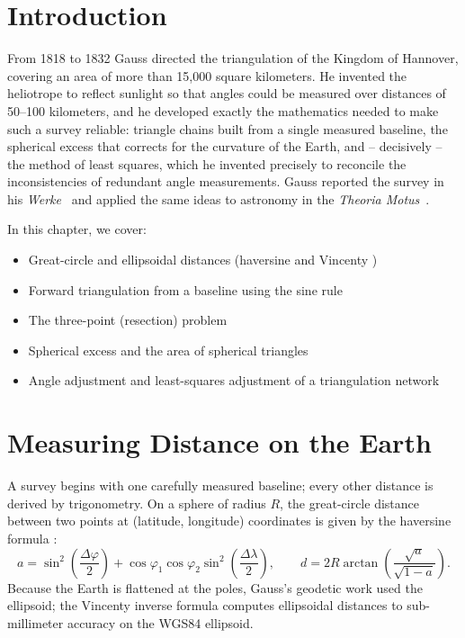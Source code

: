\section{Introduction}

From 1818 to 1832 Gauss directed the triangulation  of the Kingdom of Hannover, covering an area of more than 15{,}000 square kilometers. He invented the heliotrope  to reflect sunlight so that angles could be measured over distances of 50--100 kilometers, and he developed exactly the mathematics needed to make such a survey reliable: triangle chains built from a single measured baseline, the spherical excess  that corrects for the curvature of the Earth, and -- decisively -- the method of least squares, which he invented precisely to reconcile the inconsistencies of redundant angle measurements. Gauss reported the survey in his \textit{Werke}~\cite{gauss-works} and applied the same ideas to astronomy in the \textit{Theoria Motus}~\cite{gauss-theoria}.

In this chapter, we cover:
\begin{itemize}
    \item Great-circle and ellipsoidal distances (haversine and Vincenty )
    \item Forward triangulation from a baseline using the sine rule
    \item The three-point (resection) problem 
    \item Spherical excess and the area of spherical triangles
    \item Angle adjustment and least-squares adjustment of a triangulation network
\end{itemize}

\section{Measuring Distance on the Earth}

A survey begins with one carefully measured baseline; every other distance is derived by trigonometry. On a sphere of radius $R$, the great-circle distance between two points at (latitude, longitude) coordinates is given by the haversine formula :
\[
a = \sin^2\!\left(\frac{\Delta\varphi}{2}\right) + \cos\varphi_1 \cos\varphi_2 \sin^2\!\left(\frac{\Delta\lambda}{2}\right), \qquad
d = 2R \arctan\!\left(\frac{\sqrt{a}}{\sqrt{1-a}}\right).
\]
Because the Earth is flattened at the poles, Gauss's geodetic work used the ellipsoid; the Vincenty inverse formula computes ellipsoidal distances to sub-millimeter accuracy on the WGS84 ellipsoid.


